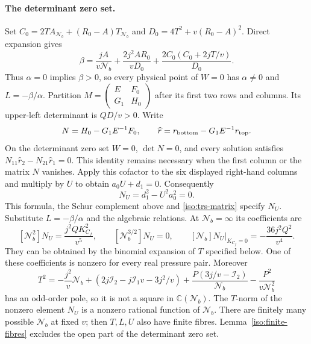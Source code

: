 \documentclass[11pt,a4paper]{article}
\numberwithin{equation}{section}
\theoremstyle{plain}
\theoremstyle{definition}
\theoremstyle{remark}
\begin{document}
\paragraph{The determinant zero set.}\label{appiso-wall}
Set $C_0=2TA_{\mathcal N_b}+(R_0-A)T_{\mathcal N_b}$ and $D_0=4T^2+v(R_0-A)^2$.  Direct expansion gives
\[
 \beta=\frac{jA}{v\mathcal N_b}+\frac{2j^2AR_0}{vD_0}
                  +\frac{2C_0(C_0+2jT/v)}{D_0}.
\]
Thus $\alpha=0$ implies $\beta>0$, so every physical point of $W=0$
has $\alpha\ne0$ and $L=-\beta/\alpha$.
Partition $M=\left(\begin{smallmatrix}E&F_0\\G_1&H_0\end{smallmatrix}\right)$
after its first two rows and columns.  Its upper-left determinant is
$QD/v>0$.  Write
\[
 N=H_0-G_1E^{-1}F_0,\qquad
 \widehat r=r_{\rm bottom}-G_1E^{-1}r_{\rm top}.
\]
On the determinant zero set $W=0$, $\det N=0$, and every solution satisfies
$N_{11}\widehat r_2-N_{21}\widehat r_1=0$.  This identity remains necessary
when the first column or the matrix $N$ vanishes. Apply this
cofactor to the six displayed right-hand columns and multiply by $U$ to
obtain $a_0U+d_1=0$.  Consequently
\[
 N_U=d_1^2-U^2a_0^2=0.
\]
This formula, the Schur complement above and \eqref{iso:trs-matrix} specify
$N_U$. Substitute $L=-\beta/\alpha$ and the algebraic relations.
At $\mathcal N_b=\infty$ its coefficients are
\begin{equation}\label{iso:wall-norm}
 [\mathcal N_b^2]N_U=\frac{j^2QK_{C_f}^2}{v^5},\qquad
 [\mathcal N_b^{3/2}]N_U=0,\qquad
 [\mathcal N_b]N_U\big|_{K_{C_f}=0}=-\frac{36j^2Q^2}{v^4}.
\end{equation}
They can be obtained by the binomial expansion of $T$ specified below.
One of these coefficients is nonzero for every real pressure pair.
Moreover
\begin{equation}\label{iso:theta-polynomial}
 T^2=-\frac{j^2}v \mathcal N_b+\left(2j\mathcal I_2-j\mathcal I_1v-3j^2/v\right)
       +\frac{P(3j/v-\mathcal I_2)}{\mathcal N_b}-\frac{P^2}{v\mathcal N_b^2}
\end{equation}
has an odd-order pole, so it is not a square in $\mathbb C(\mathcal N_b)$.
The $T$-norm of the nonzero element $N_U$ is a nonzero rational function
of $\mathcal N_b$.  There are finitely many possible $\mathcal N_b$ at fixed $v$; then $T,L,U$
also have finite fibres.  Lemma~\ref{iso:finite-fibres} excludes the open part of the determinant zero set.
\end{document}
